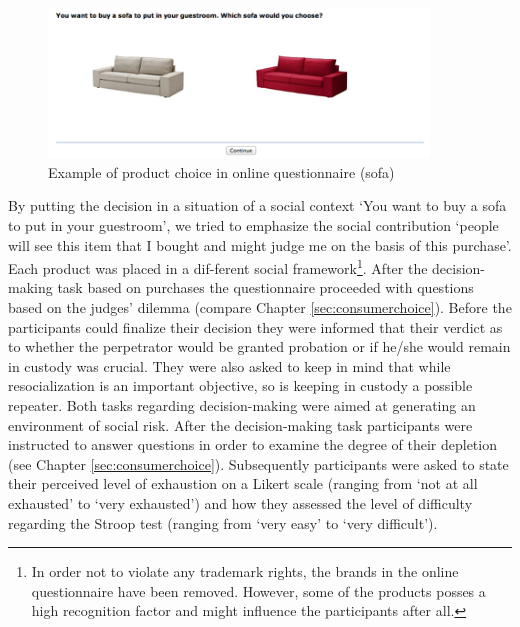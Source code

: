 \begin{figure}[h!]
\center
	\includegraphics[width=0.9\textwidth]{images/os_product_choice.png}
  \caption{Example of product choice in online questionnaire (sofa)}\label{fig:os_product_choice}
\end{figure}
By putting the decision in a situation of a social context ‘You want to buy a sofa to put in your guestroom’, we tried to emphasize the social contribution ‘people will see this item that I bought and might judge me on the basis of this purchase’. Each product was placed in a dif-ferent social framework\footnote{In order not to violate any trademark rights, the brands in the online questionnaire have been removed. However, some of the products posses a high recognition factor and might influence the participants after all.}. After the decision-making task based on purchases the questionnaire proceeded with questions based on the judges’ dilemma (compare Chapter \ref{sec:consumerchoice}). Before the participants could finalize their decision they were informed that their verdict as to whether the perpetrator would be granted probation or if he/she would remain in custody was crucial. They were also asked to keep in mind that while resocialization is an important objective, so is keeping in custody a possible repeater. Both tasks regarding decision-making were aimed at generating an environment of social risk. After the decision-making task participants were instructed to answer questions in order to examine the degree of their depletion (see Chapter \ref{sec:consumerchoice}). Subsequently participants were asked to state their perceived level of exhaustion on a Likert scale (ranging from ‘not at all exhausted’ to ‘very exhausted’) and how they assessed the level of difficulty regarding the Stroop test (ranging from ‘very easy’ to ‘very difficult’).\par


